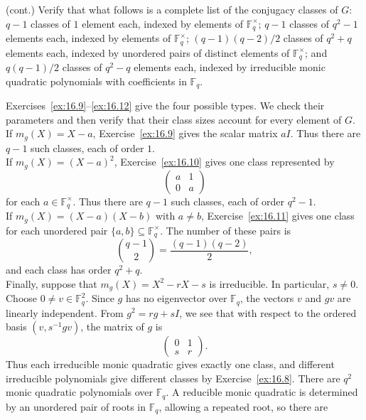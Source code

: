 \documentclass[../Odyssey_Project.tex]{subfiles}
\begin{document}
\begin{exercise}
\label{ex:16.13}
(cont.) Verify that what follows is a complete list of the conjugacy classes of $G$: $q - 1$ classes of $1$ element each, indexed by elements of $\mathbb{F}_q^\times$; $q - 1$ classes of $q^2 - 1$ elements each, indexed by elements of $\mathbb{F}_q^\times$; $(q - 1)(q - 2)/2$ classes of $q^2 + q$ elements each, indexed by unordered pairs of distinct elements of $\mathbb{F}_q^\times$; and $q(q - 1)/2$ classes of $q^2 - q$ elements each, indexed by irreducible monic quadratic polynomials with coefficients in $\mathbb{F}_q$.
\end{exercise}
\begin{solution}
    Exercises~\ref{ex:16.9}--\ref{ex:16.12} give the four possible types. We check their parameters and then verify that their class sizes account for every element of $G$.\\
    If $m_g(X)=X-a$, Exercise~\ref{ex:16.9} gives the scalar matrix $aI$. Thus there are $q-1$ such classes, each of order $1$.\\
    If $m_g(X)=(X-a)^2$, Exercise~\ref{ex:16.10} gives one class represented by
    \[
        \begin{pmatrix}
            a&1\\
            0&a
        \end{pmatrix}
    \]
    for each $a\in\mathbb{F}_q^\times$. Thus there are $q-1$ such classes, each of order $q^2-1$.\\
    If $m_g(X)=(X-a)(X-b)$ with $a\neq b$, Exercise~\ref{ex:16.11} gives one class for each unordered pair $\{a,b\}\subseteq\mathbb{F}_q^\times$. The number of these pairs is
    \[
        \binom{q-1}{2}
        =
        \frac{(q-1)(q-2)}{2},
    \]
    and each class has order $q^2+q$.\\
    Finally, suppose that $m_g(X)=X^2-rX-s$ is irreducible. In particular, $s\neq0$. Choose $0\neq v\in\mathbb{F}_q^2$. Since $g$ has no eigenvector over $\mathbb{F}_q$, the vectors $v$ and $gv$ are linearly independent. From $g^2=rg+sI$, we see that with respect to the ordered basis $(v,s^{-1}gv)$, the matrix of $g$ is
    \[
        \begin{pmatrix}
            0&1\\
            s&r
        \end{pmatrix}.
    \]
    Thus each irreducible monic quadratic gives exactly one class, and different irreducible polynomials give different classes by Exercise~\ref{ex:16.8}. There are $q^2$ monic quadratic polynomials over $\mathbb{F}_q$. A reducible monic quadratic is determined by an unordered pair of roots in $\mathbb{F}_q$, allowing a repeated root, so there are

\end{solution}
\end{document}
